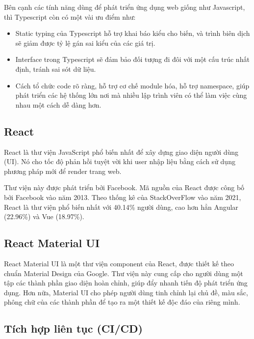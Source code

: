 \documentclass[./../main.tex]{subfiles}
\begin{document}
Bên cạnh các tính năng dùng để phát triển ứng dụng web  giống như Javascript, thì Typescript còn có một vài ưu điểm như:

\begin{itemize}
  \item
    
  Static typing của Typescript hỗ trợ khai báo kiểu cho biến, và trình biên dịch sẽ giảm được tỷ lệ gán sai kiểu của các giá trị.
    
  \item
  Interface trong Typescript sẽ đảm bảo đối tượng đi đôi với một cấu trúc nhất định, tránh sai sót dữ liệu.
    
  \item
  Cách tổ chức code rõ ràng, hỗ trợ cơ chế module hóa, hỗ trợ namespace, giúp phát triển các hệ thống lớn nơi mà nhiều lập trình viên có thể làm việc cùng nhau một cách dễ dàng hơn.

\end{itemize}

\hypertarget{react}{%
\subsection{React}\label{react}}

React là thư viện JavaScript phổ biến nhất để xây dựng giao diện người
dùng (UI). Nó cho tốc độ phản hồi tuyệt vời khi user nhập liệu bằng cách
sử dụng phương pháp mới để render trang web.

Thư viện này được phát triển bởi Facebook. Mã nguồn của React được công
bố bởi Facebook vào năm 2013. Theo thống kê của StackOverFlow vào năm
2021, React là thư viện phổ biến nhất với 40.14\% người dùng, cao hơn
hẳn Angular (22.96\%) và Vue (18.97\%).

\hypertarget{react-material-ui}{%
\subsection{React Material UI}\label{react-material-ui}}

React Material UI là một thư viện component của React, được thiết kế
theo chuẩn Material Design của Google. Thư viện này cung cấp cho người
dùng một tập các thành phần giao diện hoàn chỉnh, giúp đẩy nhanh tiến độ
phát triển ứng dụng. Hơn nữa, Material UI cho phép người dùng tinh chỉnh
lại chủ đề, màu sắc, phông chữ của các thành phần để tạo ra một thiết kế
độc đáo của riêng mình.

\hypertarget{tuxedch-hux1ee3p-liuxean-tux1ee5c-cicd}{%
\subsection{Tích hợp liên tục
(CI/CD)}\label{tuxedch-hux1ee3p-liuxean-tux1ee5c-cicd}}
\end{document}
